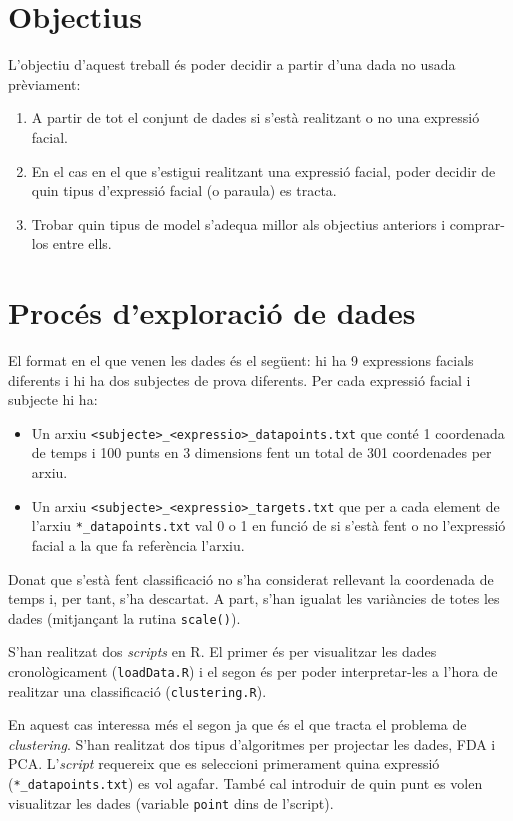 \documentclass[a4paper]{article}
\begin{document}
\section{Objectius}

L'objectiu d'aquest treball és poder decidir a partir d'una dada no usada prèviament:
\begin{enumerate}
	\item A partir de tot el conjunt de dades si s'està realitzant o no una expressió facial.
	\item En el cas en el que s'estigui realitzant una expressió facial, poder decidir de quin tipus d'expressió facial (o paraula) es tracta.
	\item Trobar quin tipus de model s'adequa millor als objectius anteriors i comprar-los entre ells.
\end{enumerate}

\section{Procés d'exploració de dades}

El format en el que venen les dades és el següent: hi ha 9 expressions facials diferents i hi ha dos subjectes de prova diferents. Per cada expressió facial i subjecte hi ha:
\begin{itemize}
	\item Un arxiu \verb|<subjecte>_<expressio>_datapoints.txt| que conté 1 coordenada de temps i 100 punts en 3 dimensions fent un total de 301 coordenades per arxiu.
	\item Un arxiu \verb|<subjecte>_<expressio>_targets.txt| que per a cada element de l'arxiu \verb|*_datapoints.txt| val 0 o 1 en funció de si s'està fent o no l'expressió facial a la que fa referència l'arxiu.
\end{itemize}

 Donat que s'està fent classificació no s'ha considerat rellevant la coordenada de temps i, per tant, s'ha descartat. A part, s'han igualat les variàncies de totes les dades (mitjançant la rutina \verb|scale()|).

S'han realitzat dos \emph{scripts} en R. El primer és per visualitzar les dades cronològicament (\verb|loadData.R|) i el segon és per poder interpretar-les a l'hora de realitzar una classificació (\verb|clustering.R|).

En aquest cas interessa més el segon ja que és el que tracta el problema de \emph{clustering}. S'han realitzat dos tipus d'algoritmes\cite{bishop} per projectar les dades, FDA i PCA. L'\emph{script} requereix que es seleccioni primerament quina expressió (\verb|*_datapoints.txt|) es vol agafar. També cal introduir de quin punt es volen visualitzar les dades (variable \verb|point| dins de l'script). 
\end{document}
